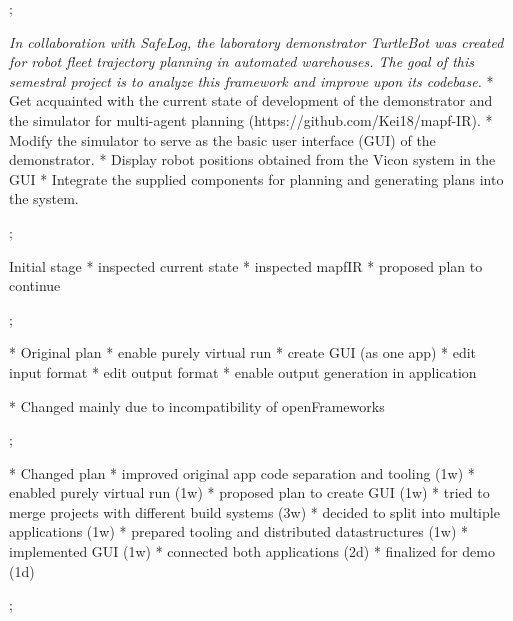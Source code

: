 

\worktype[B/EN]

\slideshow



\pg;


\textit {
    In collaboration with SafeLog, the laboratory demonstrator TurtleBot was created
    for robot fleet trajectory planning in automated warehouses. The goal of this semestral
    project is to analyze this framework and improve upon its codebase.
}
\begitems
* Get acquainted with the current state of development of the demonstrator and the simulator for multi-agent planning (https://github.com/Kei18/mapf-IR).
* Modify the simulator to serve as the basic user interface (GUI) of the demonstrator.
* Display robot positions obtained from the Vicon system in the GUI
* Integrate the supplied components for planning and generating plans into the system.
\enditems
\nl

\pg;



Initial stage
\typosize[14/14]
\begitems
* inspected current state
* inspected mapfIR
* proposed plan to continue
\enditems

\pg;


* Original plan
\typosize[14/14]
\begitems
* enable purely virtual run
* create GUI (as one app)
* edit input format
* edit output format
* enable output generation in application
\enditems

* Changed mainly due to incompatibility of openFrameworks

\pg;


* Changed plan
\typosize[14/14]
\begitems
* improved original app code separation and tooling (1w)
* enabled purely virtual run (1w)
* proposed plan to create GUI (1w)
* tried to merge projects with different build systems (3w)
* decided to split into multiple applications (1w)
* prepared tooling and distributed datastructures (1w)
* implemented GUI (1w)
* connected both applications (2d)
* finalized for demo (1d)
\enditems

\pg;

